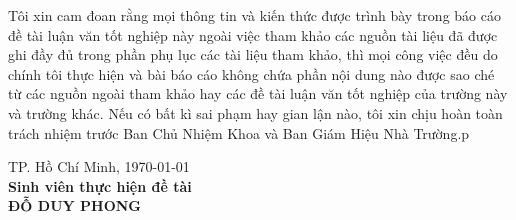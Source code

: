 \setlength\parindent{0pt}
\hspace{0.5cm}Tôi xin cam đoan rằng mọi thông tin và kiến thức được trình bày trong báo cáo đề tài luận văn tốt nghiệp này ngoài việc tham khảo các nguồn tài liệu đã được ghi đầy đủ trong phần phụ lục các tài liệu tham khảo, thì mọi công việc đều do chính tôi thực hiện và bài báo cáo không chứa phần nội dung nào được sao ché từ các nguồn ngoài tham khảo hay các đề tài luận văn tốt nghiệp của trường này và trường khác. Nếu có bất kì sai phạm hay gian lận nào, tôi xin chịu hoàn toàn trách nhiệm trước Ban Chủ Nhiệm Khoa và Ban Giám Hiệu Nhà Trường.p\\

\hspace{5cm}
\begin{minipage}[t]{0.60\linewidth}
	\begin{center}
		TP. Hồ Chí Minh, \today\\
		\textbf{Sinh viên thực hiện đề tài}\\[3cm]
		\textbf{ĐỖ DUY PHONG}
	\end{center}
\end{minipage}